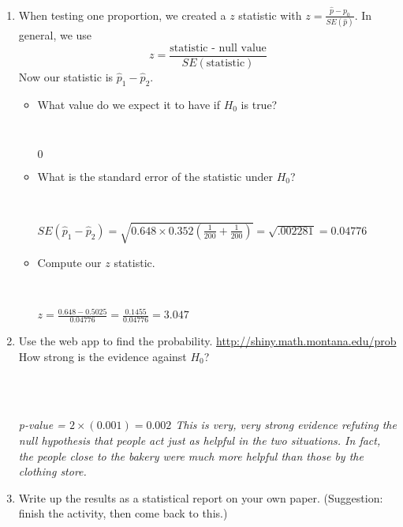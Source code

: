 \begin{enumerate}
\item When testing one proportion, we created a $z$ statistic with
$z = \frac{\widehat{p} - p_0}{SE(\widehat{p})}$.  In general, we use
$$ z = \frac{\mbox{statistic - null value}}{SE(\mbox{statistic})}$$
Now our statistic is $\widehat{p}_1 - \widehat{p}_2$.  
\begin{itemize}
\item What value do we expect it to have if $H_0$ is true?
\begin{students}
 \vspace{1cm}\\
\end{students}
\begin{key}
  $0$ \\
\end{key}
\item What is the standard error of the statistic under $H_0$?
\begin{students}
 \vspace{1cm}\\
\end{students}

\begin{key}
  $SE(\widehat{p}_1 - \widehat{p}_2 ) = \sqrt{ 0.648\times 0.352
    (\frac{1}{200} +  \frac{1}{200})} = \sqrt{.002281} = 0.04776$ 
\end{key}

\item Compute our $z$ statistic.
\begin{students}
 \vspace{1cm}\\
\end{students}
\begin{key}
 $z = \frac{ 0.648 - 0.5025}{0.04776} = \frac{0.1455}{0.04776} = 3.047$ \\
\end{key}  
\end{itemize}
\item Use the web app to find the probability.  
\url{http://shiny.math.montana.edu/prob} 
How strong is the evidence against $H_0$?
\begin{students}
 \vspace{1cm}\\
\end{students}
\begin{key}
  \\ {\it p-value = $2 \times(0.001) = 0.002$ This is very, very
    strong evidence refuting the null hypothesis that people act just
    as helpful in the two situations.  In fact, the people close to
    the bakery were much more helpful than those by the clothing
    store.  }
\end{key}

\item Write up the results as a statistical report on your own paper.
  (Suggestion:  finish the activity, then come back to this.) 
\begin{students}
 \vspace{1cm}
\end{students}

  \end{enumerate}

